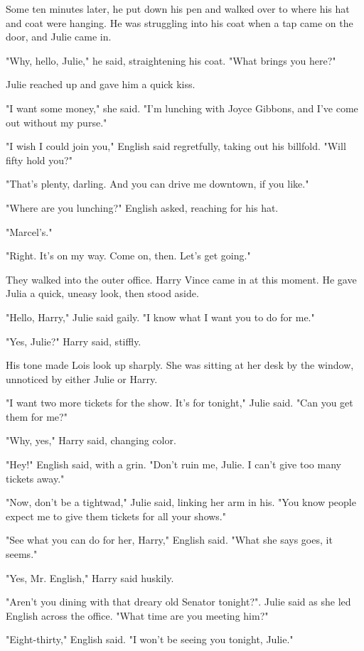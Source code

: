 \documentclass{novel}
\begin{document}
Some ten minutes later, he put down his pen and walked over to where his hat and coat were hanging. He was struggling into his coat when a tap came on the door, and Julie came in.

"Why, hello, Julie," he said, straightening his coat. "What brings you here?"

Julie reached up and gave him a quick kiss.

"I want some money," she said. "I'm lunching with Joyce Gibbons, and I've come out without my purse."

"I wish I could join you," English said regretfully, taking out his billfold. "Will fifty hold you?"

"That's plenty, darling. And you can drive me downtown, if you like."

"Where are you lunching?" English asked, reaching for his hat.

"Marcel's."

"Right. It's on my way. Come on, then. Let's get going."

They walked into the outer office. Harry Vince came in at this moment. He gave Julia a quick, uneasy look, then stood aside.

"Hello, Harry," Julie said gaily. "I know what I want you to do for me."

"Yes, Julie?" Harry said, stiffly.

His tone made Lois look up sharply. She was sitting at her desk by the window, unnoticed by either Julie or Harry.

"I want two more tickets for the show. It's for tonight," Julie said. "Can you get them for me?"

"Why, yes," Harry said, changing color.

"Hey!" English said, with a grin. "Don't ruin me, Julie. I can't give too many tickets away."

"Now, don't be a tightwad," Julie said, linking her arm in his. "You know people expect me to give them tickets for all your shows."

"See what you can do for her, Harry," English said. "What she says goes, it seems."

"Yes, Mr. English," Harry said huskily.

"Aren't you dining with that dreary old Senator tonight?". Julie said as she led English across the office. "What time are you meeting him?"

"Eight-thirty," English said. "I won't be seeing you tonight, Julie."
\end{document}
